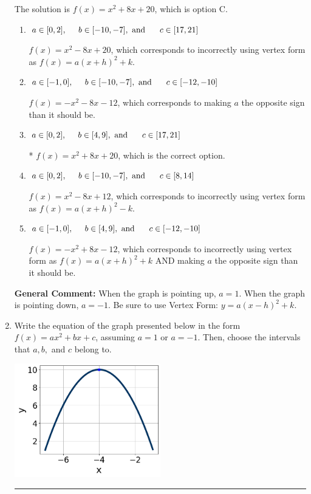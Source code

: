 \documentclass{extbook}[14pt]
\newcommand{\litem}[1]{\item #1

\rule{\textwidth}{0.4pt}}
\begin{document}
\begin{enumerate}
{The solution is \( f(x) = x^{2} +8 x + 20 \), which is option C.\begin{enumerate}[label=\Alph*.]
\item \( a \in [0, 2], \hspace*{5mm} b \in [-10, -7], \text{ and } \hspace*{5mm} c \in [17, 21] \)

$f(x)=x^{2} -8 x + 20$, which corresponds to incorrectly using vertex form as $f(x) = a(x+h)^2+k$.
\item \( a \in [-1, 0], \hspace*{5mm} b \in [-10, -7], \text{ and } \hspace*{5mm} c \in [-12, -10] \)

$f(x)=-x^{2} -8 x -12$, which corresponds to making $a$ the opposite sign than it should be.
\item \( a \in [0, 2], \hspace*{5mm} b \in [4, 9], \text{ and } \hspace*{5mm} c \in [17, 21] \)

* $f(x)=x^{2} +8 x + 20$, which is the correct option.
\item \( a \in [0, 2], \hspace*{5mm} b \in [-10, -7], \text{ and } \hspace*{5mm} c \in [8, 14] \)

$f(x)=x^{2} -8 x + 12$, which corresponds to incorrectly using vertex form as $f(x) = a(x+h)^2 - k$.
\item \( a \in [-1, 0], \hspace*{5mm} b \in [4, 9], \text{ and } \hspace*{5mm} c \in [-12, -10] \)

$f(x)=-x^{2} +8 x -12$, which corresponds to incorrectly using vertex form as $f(x) = a(x+h)^2+k$ AND making $a$ the opposite sign than it should be.
\end{enumerate}

\textbf{General Comment:} When the graph is pointing up, $a=1$. When the graph is pointing down, $a=-1$. Be sure to use Vertex Form: $y = a(x-h)^2+k$.
}
\litem{
Write the equation of the graph presented below in the form $f(x)=ax^2+bx+c$, assuming  $a=1$ or $a=-1$. Then, choose the intervals that $a, b,$ and $c$ belong to.

\begin{center}
    \includegraphics[width=0.5\textwidth]{../Figures/quadraticGraphToEquationB.png}
\end{center}


}
\end{enumerate}
\end{document}
